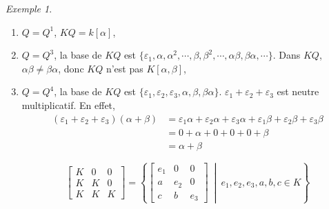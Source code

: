 \documentclass{report}
\theoremstyle{definition}
\theoremstyle{remark}
\newtheorem*{exem}{Exemple}
\begin{document}
	\begin{exem}
		\begin{enumerate}
			\item $Q=Q^1$, $KQ = k[\alpha]$,
			\item $Q=Q^3$, la base de $KQ$ est $\{\varepsilon_1, \alpha, \alpha^2, \cdots, \beta, \beta^2, \cdots, \alpha\beta, \beta\alpha, \cdots\}$. Dans $KQ$, $\alpha\beta \neq \beta\alpha$, donc $KQ$ n'est pas $K[\alpha,\beta]$,
			\item $Q=Q^4$, la base de $KQ$ est $\{\varepsilon_1, \varepsilon_2, \varepsilon_3, \alpha, \beta, \beta\alpha\}$. $\varepsilon_1+\varepsilon_2+\varepsilon_3$ est neutre multiplicatif. En effet,
			\begin{align*}
				(\varepsilon_1+\varepsilon_2+\varepsilon_3)(\alpha+\beta)&= \varepsilon_1\alpha + \varepsilon_2\alpha + \varepsilon_3\alpha + \varepsilon_1\beta + \varepsilon_2\beta + \varepsilon_3\beta\\
				&= 0 + \alpha + 0 + 0 + 0 + \beta\\
				&= \alpha+\beta
			\end{align*}

			\[ \begin{bmatrix}
				K&0&0\\
				K&K&0\\
				K&K&K
			\end{bmatrix} = \left\{ \begin{bmatrix}
				e_1&0&0\\
				a&e_2&0\\
				c&b&e_3
			\end{bmatrix} ~\middle|~ e_1,e_2,e_3,a,b,c \in K \right\} \]


\end{enumerate}
\end{exem}
\end{document}
